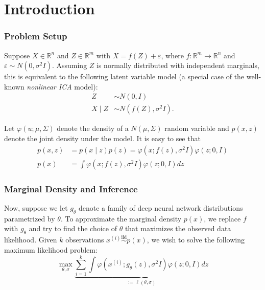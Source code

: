 \section{Introduction}
\subsubsection*{Problem Setup}
Suppose $X \in \mathbb{R}^{n}$ and $Z \in \mathbb{R}^{m}$ with $X=f(Z)+\varepsilon$, where $f: \mathbb{R}^{m} \rightarrow \mathbb{R}^{n}$ and $\varepsilon \sim N\left(0, \sigma^{2} I\right)$. Assuming $Z$ is normally distributed with independent marginals, this is equivalent to the following latent variable model (a special case of the well-known \textit{nonlinear ICA} model):
$$
\begin{aligned}
Z & \sim N\left(0, I\right) \\
X \mid Z & \sim N\left(f(Z), \sigma^{2} I\right) .
\end{aligned}
$$

Let $\varphi(u ; \mu, \Sigma)$ denote the density of a $N(\mu, \Sigma)$ random variable and $p(x, z)$ denote the joint density under the model. It is easy to see that
$$
\begin{aligned}
p\left(x, z\right) &=p \left(x \mid z\right) p(z)=\varphi\left(x ; f(z), \sigma^{2} I\right) \varphi(z ; 0, I) \\
p\left(x\right) &=\int \varphi\left(x ; f(z), \sigma^{2} I\right) \varphi(z ; 0, I) dz
\end{aligned}
$$

\subsubsection*{Marginal Density and Inference}
Now, suppose we let $g_{\theta}$ denote a family of deep neural network distributions parametrized by $\theta$. To approximate the marginal density $p(x)$, we replace $f$ with $g_{\theta}$ and try to find the choice of $\theta$ that maximizes the observed data likelihood. Given $k$ observations $x^{(i)} \stackrel{\text{iid}}{\sim} p(x)$, we wish to solve the following maximum likelihood problem:
$$
\max_{\theta, \sigma} \underbrace{\sum_{i=1}^{k} \int \varphi\left(x^{(i)} ; g_{\theta}(z), \sigma^{2} I\right) \varphi(z ; 0, I) dz}_{:=\ell(\theta, \sigma)}
$$
